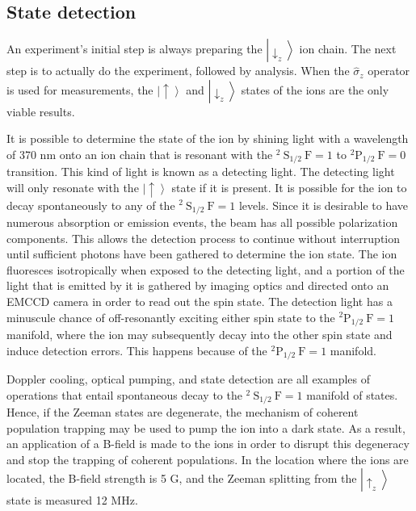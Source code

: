 \subsection{State detection}

An experiment's initial step is always preparing the $\left|\downarrow_z\right\rangle$ ion chain. The next step is to actually do the experiment, followed by analysis. When the $\hat{\sigma}_z$ operator is used for measurements, the $\left|\uparrow\right\rangle$ and $\left|\downarrow_z\right\rangle$ states of the ions are the only viable results.

It is possible to determine the state of the ion by shining light with a wavelength of 370 nm onto an ion chain that is resonant with the ${ }^2 \mathrm{~S}_{1 / 2} \mathrm{~F}=1$ to ${ }^2 \mathrm{P}_{1 / 2} \mathrm{~F}=0$ transition. This kind of light is known as a detecting light. The detecting light will only resonate with the $\left|\uparrow\right\rangle$ state if it is present. It is possible for the ion to decay spontaneously to any of the ${ }^2 \mathrm{~S}_{1 / 2} \mathrm{~F}=1$ levels. Since it is desirable to have numerous absorption or emission events, the beam has all possible polarization components. This allows the detection process to continue without interruption until sufficient photons have been gathered to determine the ion state. The ion fluoresces isotropically when exposed to the detecting light, and a portion of the light that is emitted by it is gathered by imaging optics and directed onto an EMCCD camera in order to read out the spin state. The detection light has a minuscule chance of off-resonantly exciting either spin state to the ${ }^2 \mathrm{P}_{1 / 2} \mathrm{~F}=1$ manifold, where the ion may subsequently decay into the other spin state and induce detection errors. This happens because of the ${ }^2 \mathrm{P}_{1 / 2} \mathrm{~F}=1$ manifold.

Doppler cooling, optical pumping, and state detection are all examples of operations that entail spontaneous decay to the ${ }^2 \mathrm{~S}_{1 / 2} \mathrm{~F}=1$ manifold of states. Hence, if the Zeeman states are degenerate, the mechanism of coherent population trapping may be used to pump the ion into a dark state. As a result, an application of a B-field is made to the ions in order to disrupt this degeneracy and stop the trapping of coherent populations. In the location where the ions are located, the B-field strength is 5 G, and the Zeeman splitting from the $\left|\uparrow_z\right\rangle$ state is measured 12 MHz.

